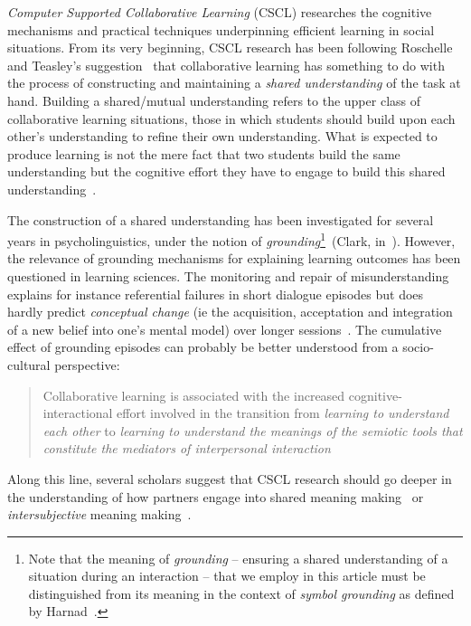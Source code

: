 \documentclass[11pt,a4paper]{report}
\begin{document}
\emph{Computer Supported Collaborative Learning} (CSCL) researches the cognitive
mechanisms and practical techniques underpinning efficient learning in social
situations. From its very beginning, CSCL research has been following
Roschelle and Teasley's suggestion~\cite{roschelle1995construction} that
collaborative learning has something to do with the process of constructing and
maintaining a \emph{shared understanding} of the task at hand. Building a shared/mutual
understanding refers to the upper class of collaborative learning situations,
those in which students should build upon each other's understanding to refine
their own understanding.  What is expected to produce learning is not the mere
fact that two students build the same understanding but the cognitive effort
they have to engage to build this shared
understanding~\cite{schwartz1995emergence}.

The construction of a shared understanding has been investigated for several
years in psycholinguistics, under the  notion of \emph{grounding}\footnote{Note
that the meaning of \emph{grounding} -- ensuring a shared understanding of a
situation during an interaction -- that we employ in this article must be
distinguished from its meaning in the context of \emph{symbol grounding} as
defined by Harnad~\cite{harnad1990symbol}.}~(Clark,
in~\cite{clark1986referring}).  However, the relevance of grounding mechanisms
for explaining learning outcomes has been questioned in learning sciences. The
monitoring and repair of misunderstanding explains for instance referential
failures in short dialogue episodes but does hardly predict \emph{conceptual
change} (ie the acquisition, acceptation and integration of a new belief into
one's mental model) over longer
sessions~\cite{dillenbourg2006sharing}. The cumulative effect of grounding
episodes can probably be better understood from a socio-cultural perspective:

\begin{quote}
Collaborative learning is associated with the increased
cognitive-interactional effort involved in the transition from \emph{learning to
understand each other} to \emph{learning to understand the meanings of the semiotic
tools that constitute the mediators of interpersonal
interaction}~\cite{baker1999role}
\end{quote}

Along this line, several scholars suggest that CSCL research should go deeper in
the understanding of how partners engage into shared meaning
making~\cite{stahl2007meaning} or \emph{intersubjective} meaning
making~\cite{suthers2006technology}.
\end{document}
